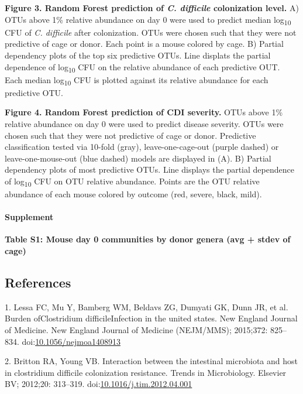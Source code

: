 \documentclass[11pt,]{article}
\begin{document}
\textbf{Figure 3. Random Forest prediction of \emph{C. difficile}
colonization level.} A) OTUs above 1\% relative abundance on day 0 were
used to predict median log\textsubscript{10} CFU of \emph{C. difficile}
after colonization. OTUs were chosen such that they were not predictive
of cage or donor. Each point is a mouse colored by cage. B) Partial
dependency plots of the top six predictive OTUs. Line displats the
partial dependence of log\textsubscript{10} CFU on the relative
abundance of each predictive OUT. Each median log\textsubscript{10} CFU
is plotted against its relative abundance for each predictive OTU.

\textbf{Figure 4. Random Forest prediction of CDI severity.} OTUs above
1\% relative abundance on day 0 were used to predict disease severity.
OTUs were chosen such that they were not predictive of cage or donor.
Predictive classification tested via 10-fold (gray), leave-one-cage-out
(purple dashed) or leave-one-mouse-out (blue dashed) models are
displayed in (A). B) Partial dependency plots of most predictive OTUs.
Line displays the partial dependence of log\textsubscript{10} CFU on OTU
relative abundance. Points are the OTU relative abundance of each mouse
colored by outcome (red, severe, black, mild).

\paragraph{Supplement}\label{supplement}

\textbf{Table S1: Mouse day 0 communities by donor genera (avg + stdev
of cage)}

\newpage

\subsection*{References}\label{references}

1. Lessa FC, Mu Y, Bamberg WM, Beldavs ZG, Dumyati GK, Dunn JR, et al.
Burden ofClostridium difficileInfection in the united states. New
England Journal of Medicine. New England Journal of Medicine (NEJM/MMS);
2015;372: 825--834.
doi:\href{http://dx.doi.org/10.1056/nejmoa1408913}{10.1056/nejmoa1408913}

2. Britton RA, Young VB. Interaction between the intestinal microbiota
and host in clostridium difficile colonization resistance. Trends in
Microbiology. Elsevier BV; 2012;20: 313--319.
doi:\href{http://dx.doi.org/10.1016/j.tim.2012.04.001}{10.1016/j.tim.2012.04.001}
\end{document}
